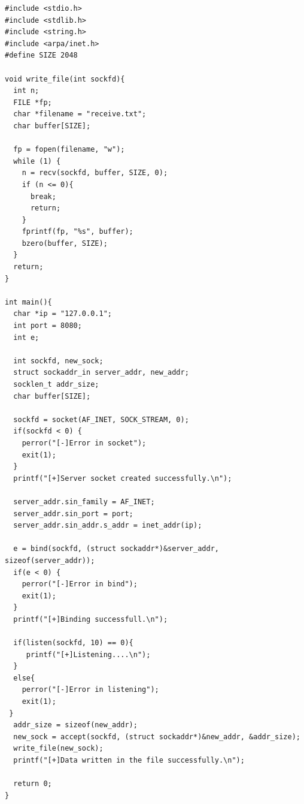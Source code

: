 \documentclass[12pt]{article}
\begin{document}
\begin{verbatim}
#include <stdio.h>
#include <stdlib.h>
#include <string.h>
#include <arpa/inet.h>
#define SIZE 2048
 
void write_file(int sockfd){
  int n;
  FILE *fp;
  char *filename = "receive.txt";
  char buffer[SIZE];
 
  fp = fopen(filename, "w");
  while (1) {
    n = recv(sockfd, buffer, SIZE, 0);
    if (n <= 0){
      break;
      return;
    }
    fprintf(fp, "%s", buffer);
    bzero(buffer, SIZE);
  }
  return;
}
 
int main(){
  char *ip = "127.0.0.1";
  int port = 8080;
  int e;
 
  int sockfd, new_sock;
  struct sockaddr_in server_addr, new_addr;
  socklen_t addr_size;
  char buffer[SIZE];
 
  sockfd = socket(AF_INET, SOCK_STREAM, 0);
  if(sockfd < 0) {
    perror("[-]Error in socket");
    exit(1);
  }
  printf("[+]Server socket created successfully.\n");
 
  server_addr.sin_family = AF_INET;
  server_addr.sin_port = port;
  server_addr.sin_addr.s_addr = inet_addr(ip);
 
  e = bind(sockfd, (struct sockaddr*)&server_addr, sizeof(server_addr));
  if(e < 0) {
    perror("[-]Error in bind");
    exit(1);
  }
  printf("[+]Binding successfull.\n");
 
  if(listen(sockfd, 10) == 0){
     printf("[+]Listening....\n");
  }
  else{
    perror("[-]Error in listening");
    exit(1);
 }
  addr_size = sizeof(new_addr);
  new_sock = accept(sockfd, (struct sockaddr*)&new_addr, &addr_size);
  write_file(new_sock);
  printf("[+]Data written in the file successfully.\n");
 
  return 0;
}
\end{verbatim}
\end{document}
